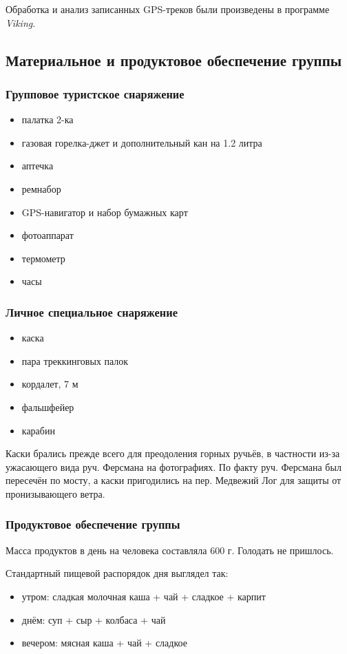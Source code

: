 Обработка и анализ записанных GPS-треков были произведены в программе \textit{Viking}.

\subsection{Материальное и продуктовое обеспечение группы}
\subsubsection{Групповое туристское снаряжение}
\begin{itemize}
\item палатка 2-ка
\item газовая горелка-джет и дополнительный кан на 1.2 литра
\item аптечка
\item ремнабор
\item GPS-навигатор и набор бумажных карт
\item фотоаппарат
\item термометр
\item часы
\end{itemize}

\subsubsection{Личное специальное снаряжение}
\begin{itemize}
\item каска
\item пара треккинговых палок
\item кордалет, 7 м
\item фальшфейер
\item карабин
\end{itemize}

Каски брались прежде всего для преодоления горных ручьёв, в частности из-за ужасающего вида руч. Ферсмана на фотографиях.
По факту руч. Ферсмана был пересечён по мосту, а каски пригодились на пер. Медвежий Лог для защиты от пронизывающего ветра.

\subsubsection{Продуктовое обеспечение группы}
Масса продуктов в день на человека составляла 600 г. Голодать не пришлось.

Стандартный пищевой распорядок дня выглядел так:
\begin{itemize}
\item утром: сладкая молочная каша + чай + сладкое + карпит
\item днём: суп + сыр + колбаса + чай
\item вечером: мясная каша + чай + сладкое
\end{itemize}

